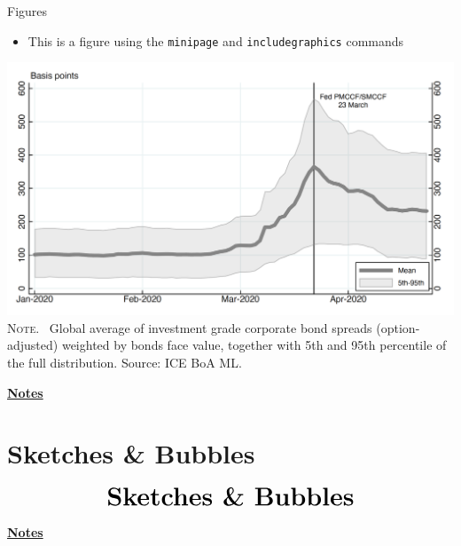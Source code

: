 \documentclass[10pt]{beamer}
\begin{document}
\begin{frame}
	{Figures}
	\begin{itemize}
		\item This is a figure using the \texttt{minipage} and \texttt{includegraphics} commands
	\end{itemize}
	\begin{center}
		\begin{minipage}[b]{.6\textwidth}
			\includegraphics[width=\textwidth]{figure}\\
			\tiny{{\scshape Note}. \ Global average of investment grade corporate bond spreads (option-adjusted) weighted by bonds face value, together with 5th and 95th percentile of the full distribution. Source: ICE BoA ML.}
		\end{minipage}
	\end{center}
\end{frame}
\begin{flushleft}
	\underline{\textbf{Notes}}\setlength{\parskip}{.15cm}\notesize\newline\par
\end{flushleft}


\section{Sketches \& Bubbles}
\begin{frame}
	\begin{eqnarray*}
		&\text{{\huge \textbf{Sketches \& Bubbles}}}\\
	\end{eqnarray*}
\end{frame}
\begin{flushleft}
	\underline{\textbf{Notes}}\setlength{\parskip}{.15cm}\notesize\newline\par
\end{flushleft}
\end{document}
